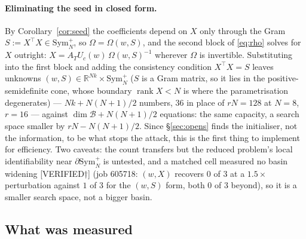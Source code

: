 \paragraph{Eliminating the seed in closed form.} By Corollary~\ref{cor:seed}
the coefficients depend on $X$ only through the Gram $S:=X^{\!\top}X\in
\mathrm{Sym}^+_N$, so $\Omega=\Omega(w,S)$, and the second block of
\eqref{eq:rho} solves for $X$ outright: $X=A_TU_c(w)\,\Omega(w,S)^{-1}$
wherever $\Omega$ is invertible. Substituting into the first block and
adding the consistency condition $X^{\!\top}X=S$ leaves unknowns
$(w,S)\in\mathbb R^{Nk}\times\mathrm{Sym}^+_N$ ($S$ is a Gram matrix, so it
lies in the positive-semidefinite cone, whose boundary
$\operatorname{rank}X<N$ is where the parametrisation degenerates) — $Nk+N(N+1)/2$ numbers, $36$
in place of $rN=128$ at $N=8$, $r=16$ — against $\dim\mathcal B+N(N+1)/2$
equations: the same capacity, a search space smaller by $rN-N(N+1)/2$. Since
\S\ref{sec:opens} finds the initialiser, not the information, to be what
stops the attack, this is the first thing to implement for efficiency. Two caveats: the
count transfers but the reduced problem's local identifiability near
$\partial\mathrm{Sym}^+_N$ is untested, and a matched cell measured no basin
widening \textnormal{[VERIFIED†]} (job 605718: $(w,X)$ recovers $0$ of $3$ at
a $1.5\times$ perturbation against $1$ of $3$ for the $(w,S)$ form, both $0$
of $3$ beyond), so it is a smaller search space, not a bigger basin.

\subsection{What was measured}
\label{sec:measured}

